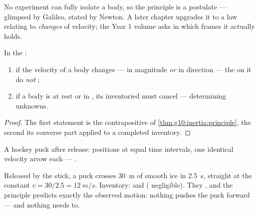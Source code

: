 \begin{remark}
No experiment can fully isolate a body, so the principle is a postulate
--- glimpsed by Galileo, stated by Newton. A later chapter upgrades it to a
law relating  to \emph{changes} of velocity; the Year 1 volume
asks in which frames it actually holds.
\end{remark}

\begin{proposition}\label{prop:g10:inertia:converse}
In the :
\begin{enumerate}
  \item if the velocity of a body changes --- in magnitude \emph{or} in
        direction --- the  on it do \emph{not} ;
  \item if a body is at rest or in , its
        inventoried  must cancel --- determining unknowns.
\end{enumerate}
\end{proposition}

\begin{proof}
The first statement is the contrapositive of
\cref{thm:g10:inertia:principle}, the second its converse part applied
to a completed inventory.
\end{proof}

\begin{omfigure}

{\small A hockey puck after release: positions at equal time intervals,
one identical velocity arrow each --- .}
\end{omfigure}

\begin{example}\label{ex:g10:inertia:puck}
Released by the stick, a puck crosses \qty{30}{m} of smooth ice in
\qty{2.5}{s}, straight at the constant $v = 30/2.5 = \qty{12}{m/s}$.
Inventory:  and  ( negligible). They
, and the principle predicts exactly the observed motion:
nothing pushes the puck forward --- and nothing needs to.
\end{example}

